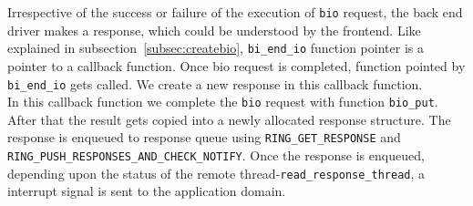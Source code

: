 Irrespective of the success or failure of the execution of \texttt{bio} request, the back end driver makes a response, which could be understood by the frontend. Like explained in subsection~\ref{subsec:createbio}, \texttt{bi\_end\_io} function pointer is a pointer to a callback function. Once bio request is completed, function pointed by \texttt{bi\_end\_io} gets called. We create a new response in this callback function.
\\
In this callback function we complete the \texttt{bio} request with function \texttt{bio\_put}. After that the result gets copied into a newly allocated response structure. The response is enqueued to response queue using \texttt{RING\_GET\_RESPONSE} and \texttt{RING\_PUSH\_RESPONSES\_AND\_CHECK\_NOTIFY}. Once the response is enqueued, depending upon the status of the remote thread-\texttt{read\_response\_thread}, a interrupt signal is sent to the application domain.
\pagebreak

% 
